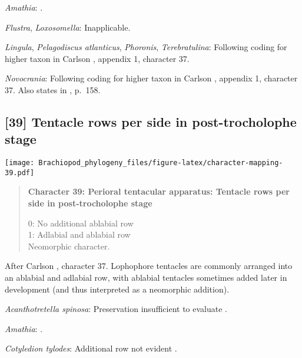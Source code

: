 \documentclass[openany]{book}
\theoremstyle{definition}
\theoremstyle{definition}
\theoremstyle{definition}
\theoremstyle{remark}
\begin{document}
\hypertarget{Amathia-coding-38}{}
\emph{Amathia}: \citep{Temereva2016Thenervous}.

\hypertarget{Flustra-coding-38}{}
\emph{Flustra}, \emph{Loxosomella}: Inapplicable.

\hypertarget{Lingula-coding-38}{}
\emph{Lingula}, \emph{Pelagodiscus atlanticus}, \emph{Phoronis},
\emph{Terebratulina}: Following coding for higher taxon in Carlson
\citeyearpar{Carlson1995Phylogeneticrelationships}, appendix 1,
character 37.

\hypertarget{Novocrania-coding-38}{}
\emph{Novocrania}: Following coding for higher taxon in Carlson
\citeyearpar{Carlson1995Phylogeneticrelationships}, appendix 1,
character 37. Also states in
\citet{Williams2000LinguliformeaCraniiformea}, p.~158.

\subsection*{{[}39{]} Tentacle rows per side in post-trocholophe
stage}\label{tentacle-rows-per-side-in-post-trocholophe-stage}

\texttt{[image: Brachiopod\_phylogeny\_files/figure-latex/character-mapping-39.pdf]}

\begin{quote}
\textbf{Character 39: Perioral tentacular apparatus: Tentacle rows per
side in post-trocholophe stage}

0: No additional ablabial row\\
1: Adlabial and ablabial row\\
Neomorphic character.
\end{quote}

After Carlson \citeyearpar{Carlson1995Phylogeneticrelationships},
character 37. Lophophore tentacles are commonly arranged into an
ablabial and adlabial row, with ablabial tentacles sometimes added later
in development (and thus interpreted as a neomorphic addition).

\hypertarget{Acanthotretella_spinosa-coding-39}{}
\emph{Acanthotretella spinosa}: Preservation insufficient to evaluate
\citep{Holmer2006Aspinose}.

\hypertarget{Amathia-coding-39}{}
\emph{Amathia}: \citep{Temereva2016Thenervous}.

\hypertarget{Cotyledion_tylodes-coding-39}{}
\emph{Cotyledion tylodes}: Additional row not evident \citep{Zhang2013}.
\end{document}
